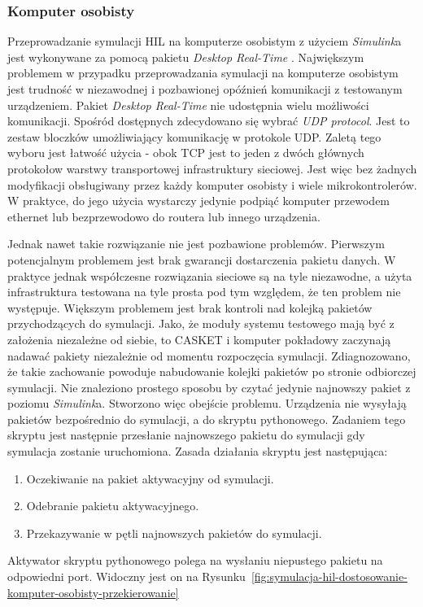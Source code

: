 \subsubsection{Komputer osobisty}
\label{subsubsec:symulacja-hil-dostosowanie-komputer-osobisty}
Przeprowadzanie symulacji HIL na komputerze osobistym z użyciem \textit{Simulink}a
jest wykonywane za pomocą pakietu \textit{Desktop Real-Time} \cite{desktop-realtime}.
Największym problemem w przypadku przeprowadzania symulacji na komputerze osobistym jest trudność
w niezawodnej i pozbawionej opóźnień komunikacji z testowanym urządzeniem. Pakiet \textit{Desktop Real-Time}
nie udostępnia wielu możliwości komunikacji. Spośród dostępnych zdecydowano się wybrać \textit{UDP protocol}.
Jest to zestaw bloczków umożliwiający komunikację w protokole UDP. Zaletą tego wyboru
jest łatwość użycia - obok TCP jest to jeden z dwóch głównych protokołow warstwy transportowej infrastruktury sieciowej.
Jest więc bez żadnych modyfikacji obsługiwany przez każdy komputer osobisty i wiele mikrokontrolerów.
W praktyce, do jego użycia wystarczy jedynie podpiąć komputer przewodem ethernet lub bezprzewodowo 
do routera lub innego urządzenia.

Jednak nawet takie rozwiązanie nie jest pozbawione problemów. 
Pierwszym potencjalnym problemem jest brak gwarancji dostarczenia pakietu danych. W praktyce jednak 
współczesne rozwiązania sieciowe są na tyle niezawodne, a użyta infrastruktura testowana na tyle prosta
pod tym względem, że ten problem nie występuje. 
Większym problemem jest brak kontroli nad kolejką pakietów przychodzących do symulacji.
Jako, że moduły systemu testowego mają być z założenia niezależne od siebie, to CASKET i komputer pokładowy 
zaczynają nadawać pakiety niezależnie od momentu rozpoczęcia symulacji. Zdiagnozowano,
że takie zachowanie powoduje nabudowanie kolejki pakietów po stronie odbiorczej symulacji.
Nie znaleziono prostego sposobu by czytać jedynie najnowszy pakiet z poziomu \textit{Simulink}a.
Stworzono więc obejście problemu. Urządzenia nie wysyłają pakietów bezpośrednio do symulacji, a do skryptu pythonowego.
Zadaniem tego skryptu jest następnie przesłanie najnowszego pakietu do symulacji gdy symulacja zostanie uruchomiona.
Zasada działania skryptu jest następująca:
\begin{enumerate}
    \item Oczekiwanie na pakiet aktywacyjny od symulacji.
    \item Odebranie pakietu aktywacyjnego.
    \item Przekazywanie w pętli najnowszych pakietów do symulacji.
\end{enumerate}
Aktywator skryptu pythonowego polega na wysłaniu niepustego pakietu na odpowiedni port.
Widoczny jest on na Rysunku~\ref{fig:symulacja-hil-dostosowanie-komputer-osobisty-przekierowanie}

